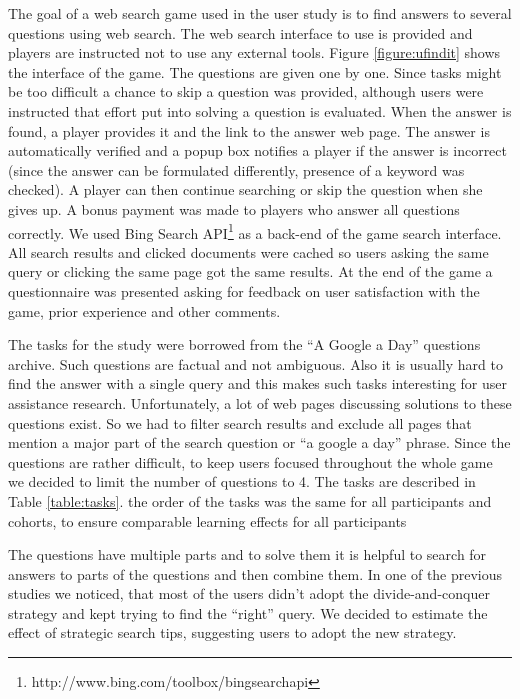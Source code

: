\documentclass{sig-alternate}
\begin{document}
The goal of a web search game used in the user study is to find answers to several questions using web search.
The web search interface to use is provided and players are instructed not to use any external tools.
Figure \ref{figure:ufindit} shows the interface of the game.
The questions are given one by one.
Since tasks might be too difficult a chance to skip a question was provided, although users were instructed that effort put into solving a question is evaluated.
When the answer is found, a player provides it and the link to the answer web page.
The answer is automatically verified and a popup box notifies a player if the answer is incorrect (since the answer can be formulated differently, presence of a keyword was checked).
A player can then continue searching or skip the question when she gives up.
A bonus payment was made to players who answer all questions correctly.
We used Bing Search API\footnote{http://www.bing.com/toolbox/bingsearchapi} as a back-end of the game search interface.
All search results and clicked documents were cached so users asking the same query or clicking the same page got the same results.
At the end of the game a questionnaire was presented asking for feedback on user satisfaction with the game, prior experience and other comments.

The tasks for the study were borrowed from the ``A Google a Day'' questions archive.
Such questions are factual and not ambiguous.
Also it is usually hard to find the answer with a single query and this makes such tasks interesting for user assistance research.
Unfortunately, a lot of web pages discussing solutions to these questions exist.
So we had to filter search results and exclude all pages that mention a major part of the search question or ``a google a day'' phrase.
Since the questions are rather difficult, to keep users focused throughout the whole game we decided to limit the number of questions to 4.
The tasks are described in Table \ref{table:tasks}.
the order of the tasks was the same for all participants and cohorts, to ensure comparable learning effects for all participants

The questions have multiple parts and to solve them it is helpful to search for answers to parts of the questions and then combine them.
In one of the previous studies we noticed, that most of the users didn't adopt the divide-and-conquer strategy and kept trying to find the ``right'' query.
We decided to estimate the effect of strategic search tips, suggesting users to adopt the new strategy.
\end{document}
